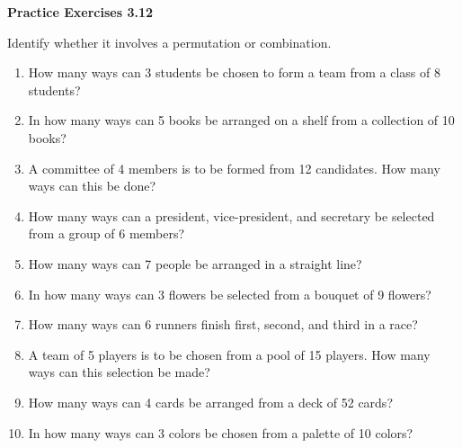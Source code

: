 \vspace{0.3ex}
\noindent\textbf{Practice Exercises 3.12}

\vspace{0.2ex}

Identify whether it involves a permutation or combination.

\begin{enumerate}[label=\color{blue}\arabic*.]
    \item How many ways can 3 students be chosen to form a team from a class of 8 students?
    \item In how many ways can 5 books be arranged on a shelf from a collection of 10 books?
    \item A committee of 4 members is to be formed from 12 candidates. How many ways can this be done?
    \item How many ways can a president, vice-president, and secretary be selected from a group of 6 members?
    \item How many ways can 7 people be arranged in a straight line?
    \item In how many ways can 3 flowers be selected from a bouquet of 9 flowers?
    \item How many ways can 6 runners finish first, second, and third in a race?
    \item A team of 5 players is to be chosen from a pool of 15 players. How many ways can this selection be made?
    \item How many ways can 4 cards be arranged from a deck of 52 cards?
    \item In how many ways can 3 colors be chosen from a palette of 10 colors?
\end{enumerate}

